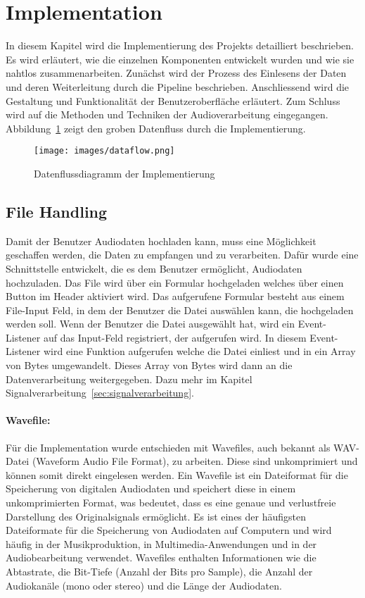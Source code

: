\section{Implementation}
\label{sec:implementation}
In diesem Kapitel wird die Implementierung des Projekts detailliert beschrieben. Es wird erläutert, wie die einzelnen Komponenten entwickelt wurden und wie sie nahtlos zusammenarbeiten. Zunächst wird der Prozess des Einlesens der Daten und deren Weiterleitung durch die Pipeline beschrieben. Anschliessend wird die Gestaltung und Funktionalität der Benutzeroberfläche erläutert. Zum Schluss wird auf die Methoden und Techniken der Audioverarbeitung eingegangen. Abbildung~\ref{fig:dataflow} zeigt den groben Datenfluss durch die Implementierung.

\begin{figure}[h]
    \centering
    \texttt{[image: images/dataflow.png]}
    \caption{Datenflussdiagramm der Implementierung}
    \label{fig:dataflow}
\end{figure}

\subsection{File Handling}
Damit der Benutzer Audiodaten hochladen kann, muss eine Möglichkeit geschaffen werden, die Daten zu empfangen und zu verarbeiten. Dafür wurde eine Schnittstelle entwickelt, die es dem Benutzer ermöglicht, Audiodaten hochzuladen. Das File wird über ein Formular hochgeladen welches über einen Button im Header aktiviert wird. Das aufgerufene Formular besteht aus einem File-Input Feld, in dem der Benutzer die Datei auswählen kann, die hochgeladen werden soll. Wenn der Benutzer die Datei ausgewählt hat, wird ein Event-Listener auf das Input-Feld registriert, der aufgerufen wird. In diesem Event-Listener wird eine Funktion aufgerufen welche die Datei einliest und in ein Array von Bytes umgewandelt. Dieses Array von Bytes wird dann an die Datenverarbeitung weitergegeben. Dazu mehr im Kapitel Signalverarbeitung~\ref*{sec:signalverarbeitung}.

\paragraph{Wavefile:}
Für die Implementation wurde entschieden mit Wavefiles, auch bekannt als WAV-Datei (Waveform Audio File Format), zu arbeiten. Diese sind unkomprimiert und können somit direkt eingelesen werden. Ein Wavefile ist ein Dateiformat für die Speicherung von digitalen Audiodaten und speichert diese in einem unkomprimierten Format, was bedeutet, dass es eine genaue und verlustfreie Darstellung des Originalsignals ermöglicht\cite{microsoft_wavefile}. Es ist eines der häufigsten Dateiformate für die Speicherung von Audiodaten auf Computern und wird häufig in der Musikproduktion, in Multimedia-Anwendungen und in der Audiobearbeitung verwendet. Wavefiles enthalten Informationen wie die Abtastrate, die Bit-Tiefe (Anzahl der Bits pro Sample), die Anzahl der Audiokanäle (mono oder stereo) und die Länge der Audiodaten.

